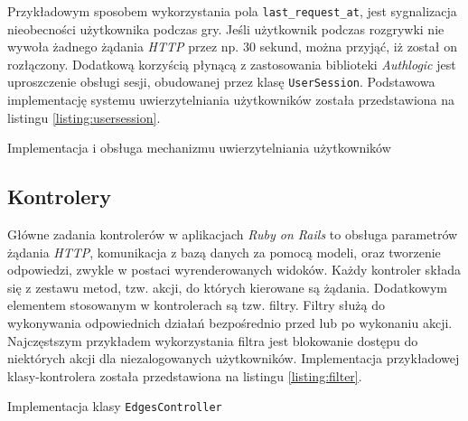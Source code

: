 \documentclass[a4paper,12pt]{article}
\begin{document}
Przykładowym sposobem wykorzystania pola \texttt{last\_request\_at},
jest sygnalizacja nieobecności użytkownika podczas gry. Jeśli
użytkownik podczas rozgrywki nie wywoła żadnego żądania \emph{HTTP}
przez np. 30 sekund, można przyjąć, iż został on rozłączony. Dodatkową
korzyścią płynącą z zastosowania biblioteki \emph{Authlogic} jest
uproszczenie obsługi sesji, obudowanej przez klasę
\texttt{UserSession}. Podstawowa implementację systemu
uwierzytelniania użytkowników została przedstawiona na listingu
\ref{listing:usersession}.

\begin{listing}
  
  \caption{Implementacja i obsługa mechanizmu uwierzytelniania
    użytkowników}
  \label{listing:usersession}
\end{listing}

\subsection{Kontrolery}

Główne zadania kontrolerów w aplikacjach \emph{Ruby on Rails} to
obsługa parametrów żądania \emph{HTTP}, komunikacja z bazą danych za
pomocą modeli, oraz tworzenie odpowiedzi, zwykle w postaci
wyrenderowanych widoków. Każdy kontroler składa się z zestawu metod,
tzw. akcji, do których kierowane są żądania. Dodatkowym elementem
stosowanym w kontrolerach są tzw. filtry. Filtry służą do wykonywania
odpowiednich działań bezpośrednio przed lub po wykonaniu
akcji. Najczęstszym przykładem wykorzystania filtra jest blokowanie
dostępu do niektórych akcji dla niezalogowanych
użytkowników. Implementacja przykładowej klasy-kontrolera została
przedstawiona na listingu \ref{listing:filter}.

\begin{listing}
  
  \caption{Implementacja klasy \texttt{EdgesController}}
  \label{listing:filter}
\end{listing}
\end{document}
